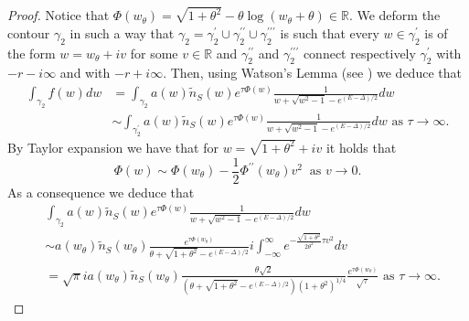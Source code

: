 \documentclass{article}
\numberwithin{equation}{section}
\theoremstyle{plain}
\begin{document}
\begin{proof}
Notice that $\Phi(w_\theta )= \sqrt{1+ \theta^2} - \theta \log(w_\theta+\theta ) \in \mathbb R $. 
We deform the contour $\gamma_2 $ in such a way that $\gamma_2 = \gamma_2^\prime \cup \gamma_2^{\prime \prime}  \cup \gamma_2^{\prime \prime \prime} $ is such  that every $w \in \gamma_2^{\prime  } $ is of the form $w =w_\theta + i v $ for some $v \in \mathbb R$  and $\gamma_2^{\prime \prime}$ and $ \gamma_2^{\prime \prime \prime} $ connect respectively $\gamma_2^\prime $ with  $- r -i\infty  $ and with $-r + i \infty $.  
Then, using Watson's Lemma (see \cite[Section 6.4]{bender2013advanced}) we deduce that
\begin{align*}
 \int_{\gamma_2}  f(w) dw &= \int_{\gamma_2}  a(w) \tilde{n}_S(w)  e^{ \tau \Phi(w) }\frac{1}{w+ \sqrt{w^2-1}- e^{(E-\Delta)/2}} dw \\
&\sim  \int_{\gamma_2^\prime}  a(w) \tilde{n}_S(w)  e^{ \tau \Phi(w) }\frac{1}{w+ \sqrt{w^2-1}- e^{(E- \Delta)/2}} dw  \text{ as } \tau \rightarrow \infty. 
\end{align*}
By Taylor expansion we have that for $w= \sqrt{1+\theta^2 } +i  v $ it holds that
\[ 
\Phi (w) \sim \Phi (w_\theta ) - \frac{1}{2} \Phi^{\prime \prime } (w_\theta ) v^2 \ \text{ as } v \to 0. 
\]
As a consequence we deduce that
\begin{align*}
&  \int_{\gamma_2}  a(w)  \tilde{n}_S(w)  e^{ \tau \Phi(w) }\frac{1}{ w+ \sqrt{w^2-1}- e^{(E-\Delta)/2}} dw \\
&\sim a(w_\theta ) \tilde{n}_S(w_\theta ) \frac{  e^{ \tau \Phi(w_\theta ) }}{\theta+ \sqrt{1+ \theta^2 } - e^{(E-\Delta)/2}} i  \int_{- \infty }^\infty  e^{- \frac{\sqrt{1+\theta^2} }{ 2 \theta^2 } \tau v^2 } dv \\
&
= \sqrt{\pi} i  a(w_\theta ) \tilde{n}_S(w_\theta ) \frac{  \theta  \sqrt{2}}{(\theta+ \sqrt{1+ \theta^2 } - e^{(E-\Delta)/2}) (1+\theta^2)^{1/4}} \frac{ e^{ \tau \Phi(w_\theta ) }}{\sqrt{\tau}} \text{ as } \tau \to \infty. 
\end{align*}


\end{proof}
\end{document}
